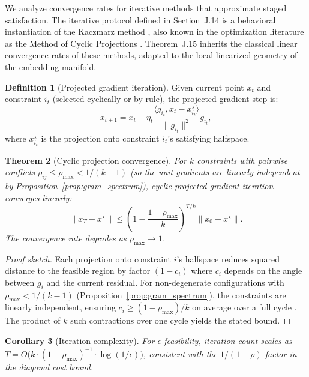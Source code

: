 \documentclass{article}
\theoremstyle{plain}
\newtheorem{theorem}{Theorem}[section]
\newtheorem{corollary}[theorem]{Corollary}
\theoremstyle{definition}
\newtheorem{definition}[theorem]{Definition}
\theoremstyle{remark}
\begin{document}
We analyze convergence rates for iterative methods that approximate staged satisfaction.
The iterative protocol defined in Section~J.14 is a behavioral instantiation of the Kaczmarz method \citep{kaczmarz1937angenaherte}, also known in the optimization literature as the Method of Cyclic Projections \citep{gubin1967projections}. Theorem~J.15 inherits the classical linear convergence rates of these methods, adapted to the local linearized geometry of the embedding manifold.

\begin{definition}[Projected gradient iteration]
Given current point $x_t$ and constraint $i_t$ (selected cyclically or by rule), the projected gradient step is:
\[
x_{t+1} = x_t - \eta_t \frac{\langle g_{i_t}, x_t - x^\star_{i_t} \rangle}{\|g_{i_t}\|^2} g_{i_t},
\]
where $x^\star_{i_t}$ is the projection onto constraint $i_t$'s satisfying halfspace.
\end{definition}

\begin{theorem}[Cyclic projection convergence]\label{thm:convergence}
For $k$ constraints with pairwise conflicts $\rho_{ij} \le \rho_{\max} < 1/(k{-}1)$ (so the unit gradients are linearly independent by Proposition~\ref{prop:gram_spectrum}), cyclic projected gradient iteration converges linearly:
\[
\|x_T - x^\star\| \le \left(1 - \frac{1-\rho_{\max}}{k}\right)^{T/k} \|x_0 - x^\star\|.
\]
The convergence rate degrades as $\rho_{\max} \to 1$.
\end{theorem}

\begin{proof}[Proof sketch]
Each projection onto constraint $i$'s halfspace reduces squared distance to the feasible region by factor $(1 - c_i)$ where $c_i$ depends on the angle between $g_i$ and the current residual. For non-degenerate configurations with $\rho_{\max} < 1/(k{-}1)$ (Proposition~\ref{prop:gram_spectrum}), the constraints are linearly independent, ensuring $c_i \ge (1-\rho_{\max})/k$ on average over a full cycle \citep[cf.][Thm.~4.1]{bauschke1996projection}. The product of $k$ such contractions over one cycle yields the stated bound.
\end{proof}

\begin{corollary}[Iteration complexity]
For $\epsilon$-feasibility, iteration count scales as $T = O\bigl(k \cdot (1-\rho_{\max})^{-1} \cdot \log(1/\epsilon)\bigr)$, consistent with the $1/(1-\rho)$ factor in the diagonal cost bound.
\end{corollary}
\end{document}
